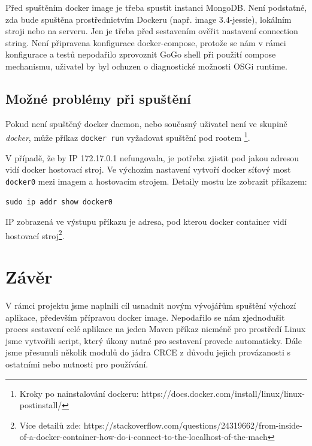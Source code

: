 \documentclass[12pt, a4paper]{article}
\begin{document}
Před spuštěním docker image je třeba spustit instanci MongoDB. Není podstatné, zda bude spuštěna prostřednictvím Dockeru (např. image 3.4-jessie), lokálním stroji nebo na serveru. Jen je třeba před sestavením ověřit nastavení connection string. Není připravena konfigurace docker-compose, protože se nám v rámci konfigurace a testů nepodařilo zprovoznit GoGo shell při použití compose mechanismu, uživatel by byl ochuzen o diagnostické možnosti OSGi runtime.


\subsection{Možné problémy při spuštění}
Pokud není spuštěný docker daemon, nebo současný uživatel není ve skupině \textit{docker}, může příkaz \verb|docker run| vyžadovat spuštění pod rootem \footnote{Kroky po nainstalování dockeru: https://docs.docker.com/install/linux/linux-postinstall/}.

V případě, že by IP 172.17.0.1 nefungovala, je potřeba zjistit pod jakou adresou vidí docker hostovací stroj. Ve výchozím nastavení vytvoří docker síťový most \verb|docker0| mezi imagem a hostovacím strojem. Detaily mostu lze zobrazit příkazem: 

\begin{verbatim}
sudo ip addr show docker0
\end{verbatim}

IP zobrazená ve výstupu příkazu je adresa, pod kterou docker container vidí hostovací stroj\footnote{Více detailů zde: https://stackoverflow.com/questions/24319662/from-inside-of-a-docker-container-how-do-i-connect-to-the-localhost-of-the-mach}.

\newpage
\section{Závěr}  %

V rámci projektu jsme naplnili cíl usnadnit novým vývojářům spuštění výchozí aplikace, především přípravou docker image. Nepodařilo se nám zjednodušit proces sestavení celé aplikace na jeden Maven příkaz nicméně pro prostředí Linux jsme vytvořili script, který úkony nutné pro sestavení provede automaticky.
Dále jsme přesunuli několik modulů do jádra CRCE z důvodu jejich provázanosti s ostatními nebo nutnosti pro používání. 
\end{document}
